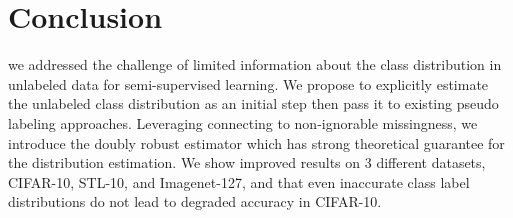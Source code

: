
\section{Conclusion}
we addressed the challenge of limited information about the class distribution in unlabeled data for semi-supervised learning. We propose to explicitly estimate the unlabeled class distribution as an initial step then pass it to existing pseudo labeling approaches.
Leveraging connecting to non-ignorable missingness, we introduce the doubly robust estimator which has strong theoretical guarantee for the distribution estimation. We show improved results on 3 different datasets, CIFAR-10, STL-10, and Imagenet-127, and that even inaccurate class label distributions do not lead to degraded accuracy in CIFAR-10.